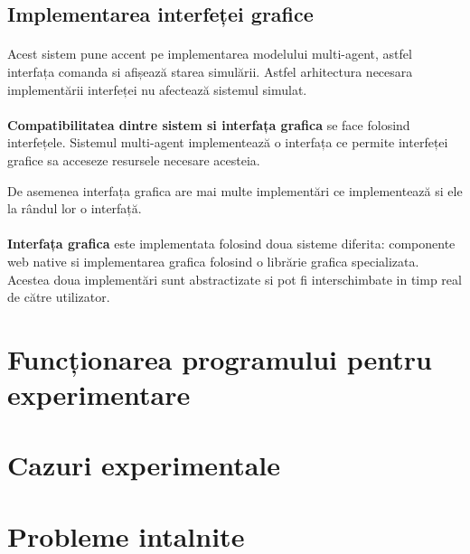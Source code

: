 \documentclass[11pt ,A4]{article}
\begin{document}
        \subsection{Implementarea interfeței grafice}
            \paragraph{}
                Acest sistem pune accent pe implementarea modelului multi-agent, astfel interfața comanda si afișează starea simulării.
                Astfel arhitectura necesara implementării interfeței nu afectează sistemul simulat.

            \paragraph{}
                \textbf{Compatibilitatea dintre sistem si interfața grafica} se face folosind interfețele.
                Sistemul multi-agent implementează o interfața ce permite interfeței grafice sa acceseze resursele necesare acesteia.

                De asemenea interfața grafica are mai multe implementări ce implementează si ele la rândul lor o interfață.

            \paragraph{}
                \textbf{Interfața grafica} este implementata folosind doua sisteme diferita: componente web native si implementarea grafica folosind o librărie grafica specializata.
                Acestea doua implementări sunt abstractizate si pot fi interschimbate  in timp real de către utilizator.

    \section{Funcționarea programului pentru experimentare}

        

    \section{Cazuri experimentale}

    \section{Probleme intalnite}
\end{document}

